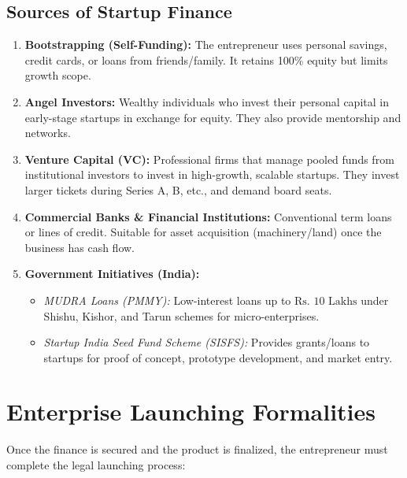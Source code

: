 \documentclass[12pt,a4paper]{article}
\begin{document}
\subsection{Sources of Startup Finance}
\begin{enumerate}[label=\textbf{\arabic*.}, leftmargin=*, itemsep=4pt]
  \item \textbf{Bootstrapping (Self-Funding):} The entrepreneur uses personal savings, credit cards, or loans from friends/family. It retains 100\% equity but limits growth scope.
  \item \textbf{Angel Investors:} Wealthy individuals who invest their personal capital in early-stage startups in exchange for equity. They also provide mentorship and networks.
  \item \textbf{Venture Capital (VC):} Professional firms that manage pooled funds from institutional investors to invest in high-growth, scalable startups. They invest larger tickets during Series A, B, etc., and demand board seats.
  \item \textbf{Commercial Banks \& Financial Institutions:} Conventional term loans or lines of credit. Suitable for asset acquisition (machinery/land) once the business has cash flow.
  \item \textbf{Government Initiatives (India):}
    \begin{itemize}[label=\tiny$\bullet$, leftmargin=1.5em, itemsep=2pt]
      \item \textit{MUDRA Loans (PMMY):} Low-interest loans up to $\text{Rs. } 10 \text{ Lakhs}$ under Shishu, Kishor, and Tarun schemes for micro-enterprises.
      \item \textit{Startup India Seed Fund Scheme (SISFS):} Provides grants/loans to startups for proof of concept, prototype development, and market entry.
    \end{itemize}
\end{enumerate}

\section{Enterprise Launching Formalities}

Once the finance is secured and the product is finalized, the entrepreneur must complete the legal launching process:
\end{document}
